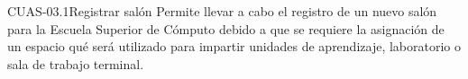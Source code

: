 \begin{UseCase}{CUAS-03.1}{Registrar salón}{
	Permite llevar a cabo el registro de un nuevo salón para la Escuela Superior de Cómputo debido a que se requiere la asignación de un espacio qué será utilizado para impartir unidades de aprendizaje, laboratorio o sala de trabajo terminal. \\
    }


%			


\end{UseCase}
